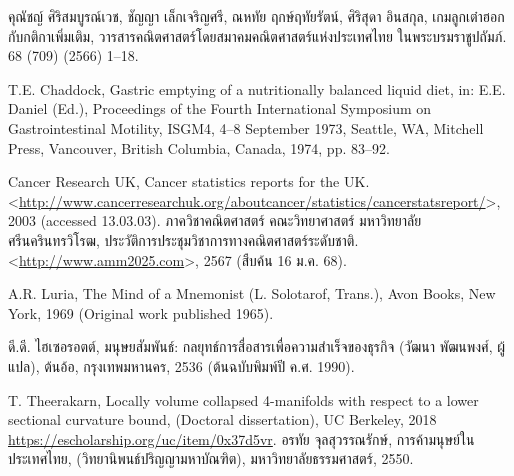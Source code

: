 \documentclass[12pt, a4paper, twoside]{article}
\theoremstyle{plain}
\theoremstyle{definition}
\theoremstyle{remark}
\numberwithin{equation}{section}
\begin{document}
\begin{thebibliography}{99}
คุณัชญ์ ศิริสมบูรณ์เวช, ชัญญา เล็กเจริญศรี, ณหทัย ฤกษ์ฤทัยรัตน์, ศิริสุดา อินสกุล, เกมลูกเต๋าฮอกกับกติกาเพิ่มเติม, วารสารคณิตศาสตร์โดยสมาคมคณิตศาสตร์แห่งประเทศไทย ในพระบรมราชูปถัมภ์. 68 (709) (2566) 1--18.

T.E. Chaddock, Gastric emptying of a nutritionally balanced liquid diet, in: E.E. Daniel (Ed.),
Proceedings of the Fourth International Symposium on Gastrointestinal Motility, ISGM4, 4--8 September 1973, Seattle,
WA, Mitchell Press, Vancouver, British Columbia, Canada, 1974, pp. 83--92.

 Cancer Research UK, Cancer statistics reports for the UK.
 <\url{http://www.cancerresearchuk.org/aboutcancer/statistics/cancerstatsreport/}>, 2003 (accessed 13.03.03).
 ภาควิชาคณิตศาสตร์ คณะวิทยาศาสตร์ มหาวิทยาลัยศรีนครินทรวิโรฒ, ประวัติการประชุมวิชาการทางคณิตศาสตร์ระดับชาติ.
 <\url{http://www.amm2025.com}>, 2567 (สืบค้น 16 ม.ค. 68).
 
 A.R. Luria, The Mind of a Mnemonist (L. Solotarof, Trans.), Avon Books, New York, 1969 (Original
work published 1965).

 ดี.ดี. ไฮเซอรอตต์, มนุษยสัมพันธ์: กลยุทธ์การสื่อสารเพื่อความสำเร็จของธุรกิจ (วัฒนา พัฒนพงศ์,
ผู้แปล), ต้นอ้อ, กรุงเทพมหานคร, 2536 (ต้นฉบับพิมพ์ปี ค.ศ. 1990).

 T. Theerakarn, Locally volume collapsed 4-manifolds with respect to a lower sectional curvature bound, (Doctoral dissertation), UC Berkeley, 2018 \url{https://escholarship.org/uc/item/0x37d5vr}.
 อรทัย จุลสุวรรณรักษ์, การค้ามนุษย์ในประเทศไทย, (วิทยานิพนธ์ปริญญามหาบัณฑิต), มหาวิทยาลัยธรรมศาสตร์, 2550.

\end{thebibliography}
\end{document}
